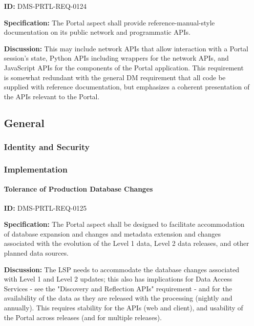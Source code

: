 \documentclass[SE,toc]{lsstdoc}
\begin{document}
\label{DMS-PRTL-REQ-0124}
\textbf{ID:} DMS-PRTL-REQ-0124

\textbf{Specification:}
The Portal aspect shall provide reference-manual-style documentation on its public network and programmatic APIs.

\textbf{Discussion:}
This may include network APIs that allow interaction with a Portal session's state, Python APIs including wrappers for the network APIs, and JavaScript APIs for the components of the Portal application.
This requirement is somewhat redundant with the general DM requirement that all code be supplied with reference documentation, but emphasizes a coherent presentation of the APIs relevant to the Portal.

\subsection{General}

\subsubsection{Identity and Security}

\subsubsection{Implementation}

\paragraph{Tolerance of Production Database Changes}\hfill  %

\label{DMS-PRTL-REQ-0125}
\textbf{ID:} DMS-PRTL-REQ-0125

\textbf{Specification:}
The Portal aspect shall be designed to facilitate accommodation of database expansion and changes and metadata extension and changes associated with the evolution of the Level 1 data, Level 2 data releases, and other planned data sources.

\textbf{Discussion:}
The LSP needs to accommodate the database changes associated with Level 1 and Level 2 updates; this also has implications for Data Access Services - see the "Discovery and Reflection APIs" requirement - and for the availability of the data as they are released with the processing (nightly and annually).  This requires stability for the APIs (web and client), and usability of the Portal across releases (and for multiple releases).
\end{document}

